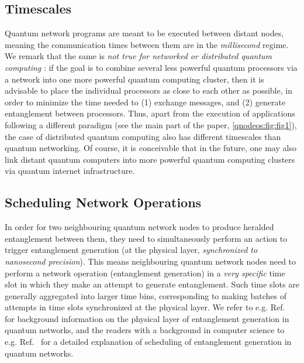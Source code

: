 \subsection{Timescales}

Quantum network programs are meant to be executed between distant nodes, meaning the communication times between them are in the \emph{millisecond} regime. We remark that the same is \emph{not true for networked or distributed quantum computing }: if the goal is to combine several less powerful quantum processors via a network into one more powerful quantum computing cluster, then it is advisable to place the individual processors as close to each other as possible, in order to minimize the time needed to (1) exchange messages, and (2) generate entanglement between processors. Thus, apart from the execution of applications following a different paradigm (see the main part of the paper, \cref{qnodeos:fig:fig1}),
the case of distributed quantum computing also has different timescales than quantum networking. Of course, it is conceivable that in the future, one may also link distant quantum computers into more powerful quantum computing clusters via quantum internet infrastructure.


\subsection{Scheduling Network Operations}

In order for two neighbouring quantum network nodes to produce heralded entanglement between them, they need to simultaneously perform an action to trigger entanglement generation (at the physical layer, \emph{synchronized to nanosecond precision}). This means neighbouring quantum network nodes need to perform a network operation (entanglement generation) in a \emph{very specific} time slot in which they make an attempt to generate entanglement. Such time slots are generally aggregated into larger time bins, corresponding to making batches of attempts in time slots synchronized at the physical layer. We refer to e.g. Ref.~\cite{pompili_2022_experimental} for background information on the physical layer of entanglement generation in quantum networks, and the readers with a background in computer science to e.g. Ref.~\cite{dahlberg_2019_egp} for a detailed explanation of scheduling of entanglement generation in quantum networks.

